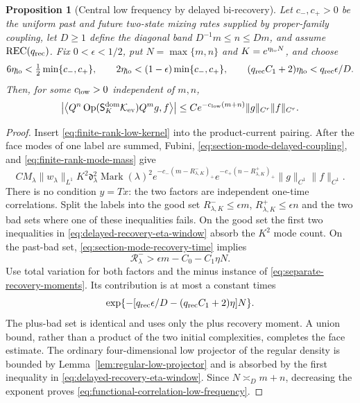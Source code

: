 \documentclass[11pt]{article}
\newtheorem{proposition}[theorem]{Proposition}
\begin{document}
\begin{proposition}[Central low frequency by delayed bi-recovery]
\label{prop:functional-correlation-low-frequency}
Let $c_-,c_+>0$ be the uniform past and future two-state mixing rates supplied
by proper-family coupling, let $D\ge1$ define the diagonal band
$D^{-1}m\le n\le Dm$, and assume $\mathrm{REC}(q_{\rm rec})$.  Fix
$0<\epsilon<1/2$, put $N=\max\{m,n\}$ and
$K=e^{\eta_{\rm lo}N}$, and choose
\begin{equation}
\label{eq:delayed-recovery-eta-window}
 6\eta_{\rm lo}<\tfrac12\min\{c_-,c_+\},\qquad
 2\eta_{\rm lo}<(1-\epsilon)\min\{c_-,c_+\},\qquad
 (q_{\rm rec}C_1+2)\eta_{\rm lo}<q_{\rm rec}\epsilon/D.
\end{equation}
Then, for some $c_{\rm low}>0$ independent of $m,n$,
\begin{equation}
\label{eq:functional-correlation-low-frequency}
 \left|\left\langle Q^n
 \operatorname{Op}(\mathsf S_K^{\rm dom}\mathcal K_{\rm ev})Q^mg,
 f\right\rangle\right|
 \le C e^{-c_{\rm low}(m+n)}\|g\|_{C^r}\|f\|_{C^r}.
\end{equation}
\end{proposition}

\begin{proof}
Insert \eqref{eq:finite-rank-low-kernel} into the product-current pairing.
After the face modes of one label are summed, Fubini,
\eqref{eq:section-mode-delayed-coupling}, and
\eqref{eq:finite-rank-mode-mass} give
\[
 C M_\lambda\|w_\lambda\|_{L^1}K^2\mathfrak d_\lambda^2
 \operatorname{Mark}(\lambda)^2
 e^{-c_-(m-R^-_{\lambda,K})_+}
 e^{-c_+(n-R^+_{\lambda,K})_+}
 \|g\|_{C^1}\|f\|_{C^1}.
\]
There is no condition $y=Tx$: the two factors are independent one-time
correlations.  Split the labels into the good set
$R^-_{\lambda,K}\le\epsilon m$, $R^+_{\lambda,K}\le\epsilon n$ and the two
bad sets where one of these inequalities fails.  On the good set the first
two inequalities in \eqref{eq:delayed-recovery-eta-window} absorb the
$K^2$ mode count.  On the past-bad set,
\eqref{eq:section-mode-recovery-time} implies
\[
 \mathcal R^-_\lambda>\epsilon m-C_0-C_1\eta N.
\]
Use total variation for both factors and the minus instance of
\eqref{eq:separate-recovery-moments}.  Its contribution is at most a constant
times
\[
 \exp\{-[q_{\rm rec}\epsilon/D-(q_{\rm rec}C_1+2)\eta]N\}.
\]
The plus-bad set is identical and uses only the plus recovery moment.  A
union bound, rather than a product of the two initial complexities, completes
the face estimate.  The ordinary four-dimensional low projector of the
regular density is bounded by Lemma~\ref{lem:regular-low-projector} and is absorbed by the
first inequality in \eqref{eq:delayed-recovery-eta-window}.  Since
$N\asymp_Dm+n$, decreasing the exponent proves
\eqref{eq:functional-correlation-low-frequency}.
\end{proof}
\end{document}

